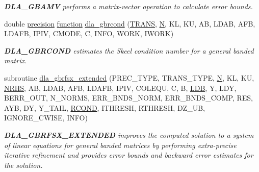 \begin{DoxyCompactItemize}
\begin{DoxyCompactList}\small\item\em {\bfseries D\+L\+A\+\_\+\+G\+B\+A\+M\+V} performs a matrix-\/vector operation to calculate error bounds. \end{DoxyCompactList}\item 
double \hyperlink{numinquire_8h_a2c8e616467665d0b2814d4c1589ba74e}{precision} \hyperlink{afunc_8m_a7b5e596df91eadea6c537c0825e894a7}{function} \hyperlink{group__doubleGBcomputational_gaaba1ee21e8fd1cd00fb281569f2c2d0a}{dla\+\_\+gbrcond} (\hyperlink{superlu__enum__consts_8h_a0c4e17b2d5cea33f9991ccc6a6678d62a1f61e3015bfe0f0c2c3fda4c5a0cdf58}{T\+R\+A\+N\+S}, \hyperlink{polmisc_8c_a0240ac851181b84ac374872dc5434ee4}{N}, K\+L, K\+U, A\+B, L\+D\+A\+B, A\+F\+B, L\+D\+A\+F\+B, I\+P\+I\+V, C\+M\+O\+D\+E, C, I\+N\+F\+O, W\+O\+R\+K, I\+W\+O\+R\+K)
\begin{DoxyCompactList}\small\item\em {\bfseries D\+L\+A\+\_\+\+G\+B\+R\+C\+O\+N\+D} estimates the Skeel condition number for a general banded matrix. \end{DoxyCompactList}\item 
subroutine \hyperlink{group__doubleGBcomputational_ga1520b1b9984236f0315d6fc077e4eb04}{dla\+\_\+gbrfsx\+\_\+extended} (P\+R\+E\+C\+\_\+\+T\+Y\+P\+E, T\+R\+A\+N\+S\+\_\+\+T\+Y\+P\+E, \hyperlink{polmisc_8c_a0240ac851181b84ac374872dc5434ee4}{N}, K\+L, K\+U, \hyperlink{example__user_8c_aa0138da002ce2a90360df2f521eb3198}{N\+R\+H\+S}, A\+B, L\+D\+A\+B, A\+F\+B, L\+D\+A\+F\+B, I\+P\+I\+V, C\+O\+L\+E\+Q\+U, C, B, \hyperlink{example__user_8c_a50e90a7104df172b5a89a06c47fcca04}{L\+D\+B}, Y, L\+D\+Y, B\+E\+R\+R\+\_\+\+O\+U\+T, N\+\_\+\+N\+O\+R\+M\+S, E\+R\+R\+\_\+\+B\+N\+D\+S\+\_\+\+N\+O\+R\+M, E\+R\+R\+\_\+\+B\+N\+D\+S\+\_\+\+C\+O\+M\+P, R\+E\+S, A\+Y\+B, D\+Y, Y\+\_\+\+T\+A\+I\+L, \hyperlink{superlu__enum__consts_8h_af00a42ecad444bbda75cde1b64bd7e72a9b5c151728d8512307565994c89919d5}{R\+C\+O\+N\+D}, I\+T\+H\+R\+E\+S\+H, R\+T\+H\+R\+E\+S\+H, D\+Z\+\_\+\+U\+B, I\+G\+N\+O\+R\+E\+\_\+\+C\+W\+I\+S\+E, I\+N\+F\+O)
\begin{DoxyCompactList}\small\item\em {\bfseries D\+L\+A\+\_\+\+G\+B\+R\+F\+S\+X\+\_\+\+E\+X\+T\+E\+N\+D\+E\+D} improves the computed solution to a system of linear equations for general banded matrices by performing extra-\/precise iterative refinement and provides error bounds and backward error estimates for the solution. \end{DoxyCompactList}\item 

\end{DoxyCompactItemize}
